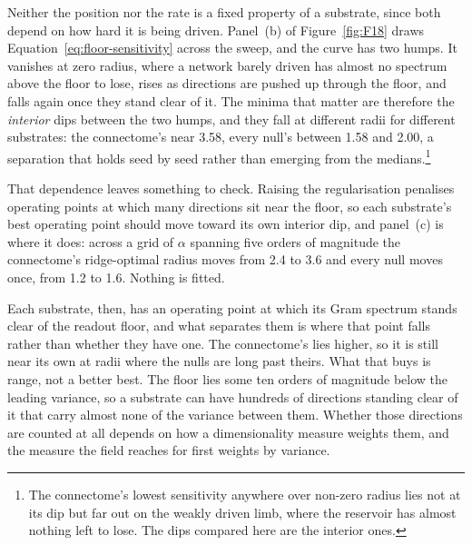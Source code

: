 Neither the position nor the rate is a fixed property of a substrate, since both
depend on how hard it is being driven. Panel~(b) of Figure~\ref{fig:F18} draws
Equation~\ref{eq:floor-sensitivity} across the sweep, and the curve has two
humps. It vanishes at zero radius, where a network barely driven has almost no
spectrum above the floor to lose, rises as directions are pushed up through the
floor, and falls again once they stand clear of it. The minima that matter are
therefore the \emph{interior} dips between the two humps, and they fall at
different radii for different substrates: the connectome's near
3.58, %
every null's between 1.58 and 2.00, %
a separation that holds seed by seed rather than emerging from the
medians.\footnote{The connectome's lowest
sensitivity anywhere over non-zero radius lies not at its dip but far out on the
weakly driven limb, %
where the reservoir has almost nothing left to lose. The dips compared here are
the interior ones.}

That dependence leaves something to check. Raising the regularisation penalises
operating points at which many directions sit near the floor, so each
substrate's best operating point should move toward its own interior dip, and
panel~(c) is where it does: across a grid of $\alpha$ spanning five orders of
magnitude %
the connectome's ridge-optimal radius moves from
2.4 to 3.6 %
and every null moves once, from
1.2 to 1.6. %
Nothing is fitted.

Each substrate, then, has an operating point at which its Gram spectrum stands
clear of the readout floor, and what separates them is where that point falls
rather than whether they have one. The connectome's lies higher, so it is still near its own at radii where the
nulls are long past theirs. What that buys is range, not a better best. The
floor lies some ten
orders of magnitude %
below the leading variance, so a substrate can have hundreds of directions
standing clear of it that carry almost none of the variance between them.
Whether those directions are counted at all depends on how a dimensionality
measure weights them, and the measure the field reaches for first weights by
variance.









